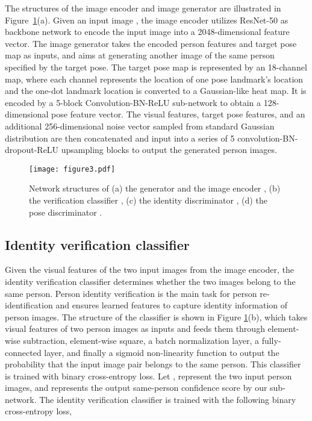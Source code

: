 \documentclass{article}
\begin{document}
The structures of the image encoder  and image generator  are illustrated in Figure~\ref{fig:module}(a). Given an input image , the image encoder  utilizes ResNet-50 as backbone network to encode the input image into a 2048-dimensional feature vector. The image generator  takes the encoded person features and target pose map as inputs, and aims at generating another image of the same person specified by the target pose. The target pose map is represented by an 18-channel map, where each channel represents the location of one pose landmark's location and the one-dot landmark location is converted to a Gaussian-like heat map. It is encoded by a 5-block Convolution-BN-ReLU sub-network to obtain a 128-dimensional pose feature vector. The visual features, target pose features, and an additional 256-dimensional noise vector sampled from standard Gaussian distribution are then concatenated and input into a series of 5 convolution-BN-dropout-ReLU upsampling blocks to output the generated person images.

\begin{figure}[tb]
\centering
\texttt{[image: figure3.pdf]}
\caption{Network structures of (a) the generator  and the image encoder , (b) the verification classifier , (c) the identity discriminator , (d) the pose discriminator .}
\label{fig:module}
\end{figure}

\subsection{Identity verification classifier}
\label{sec:IVC}

Given the visual features of the two input images from the image encoder, the identity verification classifier  determines whether the two images belong to the same person. Person identity verification is the main task for person re-identification and ensures learned features to capture identity information of person images. The structure of the classifier is shown in Figure \ref{fig:module}(b), which takes visual features of two person images as inputs and feeds them through element-wise subtraction, element-wise square, a batch normalization layer, a fully-connected layer, and finally a sigmoid non-linearity function to output the probability that the input image pair belongs to the same person. This classifier is trained with binary cross-entropy loss. Let ,  represent the two input person images, and  represents the output same-person confidence score by our sub-network. The identity verification classifier  is trained with the following binary cross-entropy loss,
\end{document}
